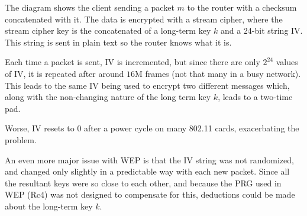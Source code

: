 \documentclass[10pt,a4paper]{report}
\begin{document}
\begin{figure}[H]
    \centering
\end{figure}

The diagram shows the client sending a packet $m$ to the router with a checksum concatenated with
it. The data is encrypted with a stream cipher, where the stream cipher key is the concatenated of
a long-term key $k$ and a 24-bit string $\text{IV}$. This string is sent in plain text so the
router knows what it is.

Each time a packet is sent, $\text{IV}$ is incremented, but since there are only $2^{24}$ values of
$\text{IV}$, it is repeated after around $16 \text{M}$ frames (not that many in a busy network).
This leads to the same $\text{IV}$ being used to encrypt two different messages which, along with
the non-changing nature of the long term key $k$, leads to a two-time pad.

Worse, $\text{IV}$ resets to 0 after a power cycle on many 802.11 cards, exacerbating the
problem.

An even more major issue with WEP is that the $\text{IV}$ string was not randomized, and changed
only slightly in a predictable way with each new packet. Since all the resultant keys were so close
to each other, and because the PRG used in WEP (Rc4) was not designed to compensate for this,
deductions could be made about the long-term key $k$.
\end{document}

